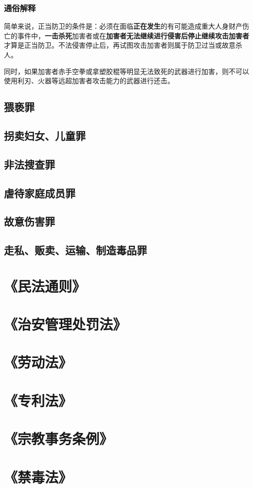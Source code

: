 \documentclass[UTF8]{ctexart}
\begin{document}
\subsubsection{通俗解释}
简单来说，正当防卫的条件是：必须在面临\textbf{正在发生}的有可能造成重大人身财产伤亡的事件中，\textbf{一击杀死}加害者或在\textbf{加害者无法继续进行侵害后停止继续攻击加害者}才算是正当防卫。不法侵害停止后，再试图攻击加害者则属于防卫过当或故意杀人。

同时，如果加害者赤手空拳或拿塑胶棍等明显无法致死的武器进行加害，则不可以使用利刃、火器等远超加害者攻击能力的武器进行还击。
\subsection{猥亵罪}
\subsection{拐卖妇女、儿童罪}
\subsection{非法搜查罪}
\subsection{虐待家庭成员罪}
\subsection{故意伤害罪}
\subsection{走私、贩卖、运输、制造毒品罪}
\section{《民法通则》}
\section{《治安管理处罚法》}
\section{《劳动法》}
\section{《专利法》}
\section{《宗教事务条例》}
\section{《禁毒法》}
\end{document}
